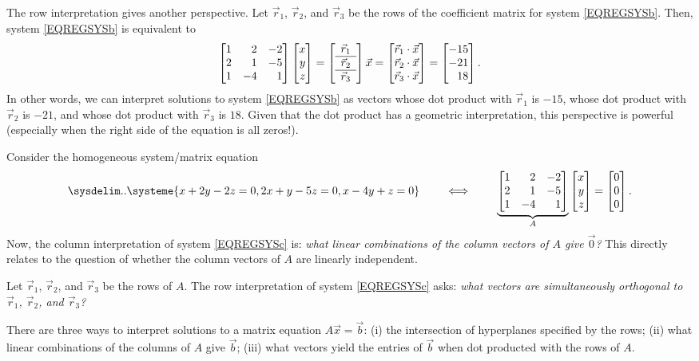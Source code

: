The row interpretation gives another perspective. Let $\vec r_1$, $\vec r_2$, and $\vec r_3$ be the rows of the coefficient matrix
for system \eqref{EQREGSYSb}. Then, system \eqref{EQREGSYSb} is equivalent to
\[
	\mat{1&2&-2\\2&1&-5\\1&-4&1}\mat{x\\y\\z}=
	\left[\begin{array}{c}\vec r_1\\\hline\vec r_2\\\hline\vec r_3\end{array}\right]\vec x=
	\mat{\vec r_1\cdot \vec x\\\vec r_2\cdot\vec x\\\vec r_3\cdot \vec x}
	     =\mat{-15\\-21\\18}.
\]
In other words, we can interpret solutions to system \eqref{EQREGSYSb} as vectors whose dot product
with $\vec r_1$ is $-15$, whose dot product with $\vec r_2$ is $-21$, and whose dot product with
$\vec r_3$ is $18$. Given that the dot product has a geometric interpretation, this perspective is powerful
(especially when the right side of the equation is all zeros!).

Consider the homogeneous system/matrix equation
\begin{equation}
	\label{EQREGSYSc}
	\sysdelim..
		\systeme{
			x+2y-2z=0,
			2x+y-5z=0,
			x-4y+z=0
		}
		\qquad\iff\qquad
		\underbrace{\mat{1&2&-2\\2&1&-5\\1&-4&1}}_A\mat{x\\y\\z}=\mat{0\\0\\0}
		.
\end{equation}
Now, the column interpretation of system \eqref{EQREGSYSc} is: \emph{what linear combinations of the column vectors
of $A$ give $\vec 0$?} This directly relates to the question of whether the column vectors of $A$ are linearly independent.

Let $\vec r_1$, $\vec r_2$, and $\vec r_3$ be the rows of $A$. The row interpretation of system \eqref{EQREGSYSc} asks:
\emph{what vectors are simultaneously orthogonal to $\vec r_1$, $\vec r_2$, and $\vec r_3$?}

\begin{emphbox}[Takeaway]
	There are three ways to interpret solutions to a matrix equation $A\vec x=\vec b$: (i) the intersection of hyperplanes
	specified by the rows; (ii) what linear combinations of the columns of $A$ give $\vec b$; (iii) what vectors yield
	the entries of $\vec b$ when dot producted with the rows of $A$.
\end{emphbox}

